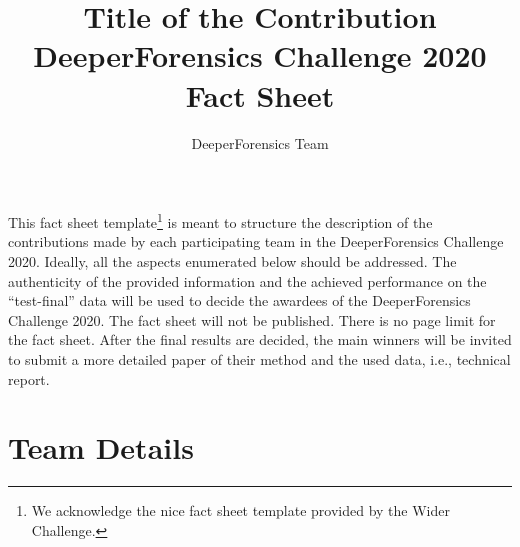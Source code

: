 \documentclass[runningheads]{llncs}
\begin{document}
\pagestyle{headings}
\mainmatter

\title{Title of the Contribution\\DeeperForensics Challenge 2020\\Fact Sheet} %



\author{DeeperForensics Team}
\institute{\empty}

\maketitle


This fact sheet template\footnote{We acknowledge the nice fact sheet template provided by the Wider Challenge.} is meant to structure the description of the contributions made by each participating team in the DeeperForensics Challenge 2020. 
%
Ideally, all the aspects enumerated below should be addressed. The authenticity of the provided information and the achieved performance on the ``test-final'' data will be used to decide the awardees of the DeeperForensics Challenge 2020. The fact sheet will not be published. There is no page limit for the fact sheet.
%
After the final results are decided, the main winners will be invited to submit a more detailed paper of their method and the used data, i.e., technical report.


\section{Team Details}
\end{document}
